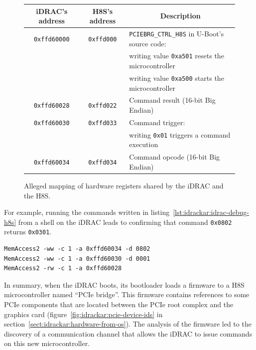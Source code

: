 \begin{figure}[ht]
  \begin{tabular}{|c|c|l|}
    \hline
    \bf iDRAC's address & \bf H8S's address & \multicolumn{1}{c|}{\bf Description} \\
    \hline
    \texttt{0xffd60000} & \texttt{0xffd000} & \texttt{PCIEBRG\_CTRL\_H8S} in U-Boot's source code: \\
        & & writing value \texttt{0xa501} resets the microcontroller \\
        & & writing value \texttt{0xa500} starts the microcontroller \\
    \hline
    \texttt{0xffd60028} & \texttt{0xffd022} & Command result (16-bit Big Endian) \\
    \hline
    \texttt{0xffd60030} & \texttt{0xffd033} & Command trigger: \\
        & & writing \texttt{0x01} triggers a command execution \\
    \hline
    \texttt{0xffd60034} & \texttt{0xffd034} & Command opcode (16-bit Big Endian) \\
    \hline
  \end{tabular}
  \caption{Alleged mapping of hardware registers shared by the iDRAC and the H8S.}
  \label{fig:idrackar:h8s-debug-regs-mapping}
  \vspace*{-.3cm}
\end{figure}

For example, running the commands written in listing~\ref{lst:idrackar:idrac-debug-h8s} from a shell on the iDRAC leads to confirming that command \texttt{0x0802} returns \texttt{0x0301}.

\begin{lstlisting}[language={},caption={Executing operation \texttt{0x0802} on H8S microcontroller.},label={lst:idrackar:idrac-debug-h8s}]
MemAccess2 -ww -c 1 -a 0xffd60034 -d 0802
MemAccess2 -ww -c 1 -a 0xffd60030 -d 0001
MemAccess2 -rw -c 1 -a 0xffd60028
\end{lstlisting}

In summary, when the iDRAC boots, its bootloader loads a firmware to a H8S microcontroller named ``PCIe bridge''.
This firmware contains references to some PCIe components that are located between the PCIe root complex and the graphics card (figure~\ref{fig:idrackar:pcie-device-ids} in section~\ref{sect:idrackar:hardware-from-os}).
The analysis of the firmware led to the discovery of a communication channel that allows the iDRAC to issue commands on this new microcontroller.


